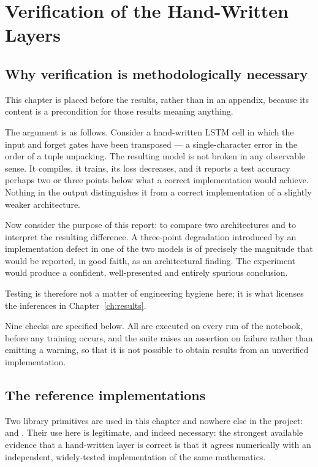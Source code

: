 \chapter{Verification of the Hand-Written Layers}
\label{ch:verification}

\section{Why verification is methodologically necessary}

This chapter is placed before the results, rather than in an appendix, because its content is a
precondition for those results meaning anything.

The argument is as follows. Consider a hand-written LSTM cell in which the input and forget gates
have been transposed --- a single-character error in the order of a tuple unpacking. The resulting
model is not broken in any observable sense. It compiles, it trains, its loss decreases, and it
reports a test accuracy perhaps two or three points below what a correct implementation would
achieve. Nothing in the output distinguishes it from a correct implementation of a slightly weaker
architecture.

Now consider the purpose of this report: to compare two architectures and to interpret the
resulting difference. A three-point degradation introduced by an implementation defect in one of
the two models is of precisely the magnitude that would be reported, in good faith, as an
architectural finding. The experiment would produce a confident, well-presented and entirely
spurious conclusion.

 Testing is therefore not a matter of engineering hygiene here; it is
what licenses the inferences in Chapter~\ref{ch:results}.

Nine checks are specified below. All are executed on every run of the notebook, before any training
occurs, and the suite raises an assertion on failure rather than emitting a warning, so that it is
not possible to obtain results from an unverified implementation.

\section{The reference implementations}

Two library primitives are used in this chapter and nowhere else in the project:
 and . Their use here is legitimate, and indeed necessary: the
strongest available evidence that a hand-written layer is correct is that it agrees numerically
with an independent, widely-tested implementation of the same mathematics.

